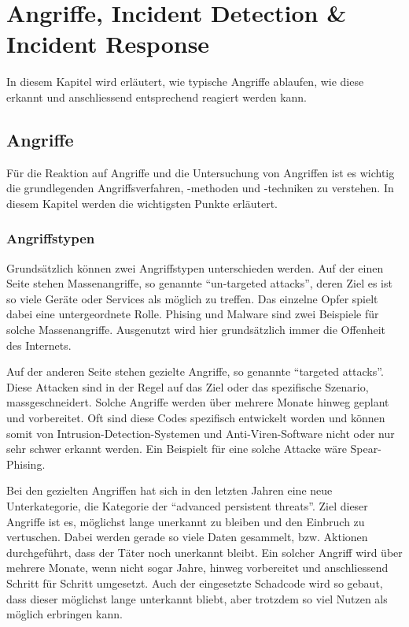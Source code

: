 \chapter{Angriffe, Incident Detection \& Incident Response} \label{chap:AIDIR}
In diesem Kapitel wird erläutert, wie typische Angriffe ablaufen, wie diese erkannt und anschliessend entsprechend reagiert werden kann.


\section{Angriffe}
Für die Reaktion auf Angriffe und die Untersuchung von Angriffen ist es wichtig die grundlegenden Angriffsverfahren, -methoden und -techniken zu verstehen. In diesem Kapitel werden die wichtigsten Punkte erläutert.


\subsection{Angriffstypen}
Grundsätzlich können zwei Angriffstypen unterschieden werden. Auf der einen Seite stehen Massenangriffe, so genannte "`un-targeted attacks"', deren Ziel es ist so viele Geräte oder Services als möglich zu treffen. Das einzelne Opfer spielt dabei eine untergeordnete Rolle. Phising und Malware sind zwei Beispiele für solche Massenangriffe. Ausgenutzt wird hier grundsätzlich immer die Offenheit des Internets.

Auf der anderen Seite stehen gezielte Angriffe, so genannte "`targeted attacks"'. Diese Attacken sind in der Regel auf das Ziel oder das spezifische Szenario, massgeschneidert. Solche Angriffe werden über mehrere Monate hinweg geplant und vorbereitet. Oft sind diese Codes spezifisch entwickelt worden und können somit von Intrusion-Detection-Systemen und Anti-Viren-Software nicht oder nur sehr schwer erkannt werden. Ein Beispielt für eine solche Attacke wäre Spear-Phising.

Bei den gezielten Angriffen hat sich in den letzten Jahren eine neue Unterkategorie, die Kategorie der "`advanced persistent threats"'. Ziel dieser Angriffe ist es, möglichst lange unerkannt zu bleiben und den Einbruch zu vertuschen. Dabei werden gerade so viele Daten gesammelt, bzw. Aktionen durchgeführt, dass der Täter noch unerkannt bleibt. Ein solcher Angriff wird über mehrere Monate, wenn nicht sogar Jahre, hinweg vorbereitet und anschliessend Schritt für Schritt umgesetzt. Auch der eingesetzte Schadcode wird so gebaut, dass dieser möglichst lange unterkannt bliebt, aber trotzdem so viel Nutzen als möglich erbringen kann.


